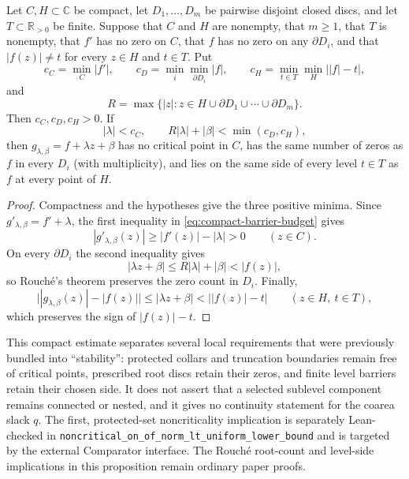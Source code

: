 \documentclass[11pt]{article}
\begin{document}
\begin{proposition}\label{prop:compact-barrier1041}
Let $C,H\subset\mathbb C$ be compact, let $D_1,\ldots,D_m$ be pairwise
disjoint closed discs, and let $T\subset\mathbb R_{>0}$ be finite.  Suppose
that $C$ and $H$ are nonempty, that $m\geq1$, that $T$ is nonempty,
that $f'$ has no zero on $C$, that $f$ has no zero on any $\partial D_i$, and
that $|f(z)|\ne t$ for every $z\in H$ and $t\in T$.  Put
\[
 c_C=\min_C|f'|,\qquad
 c_D=\min_i\min_{\partial D_i}|f|,\qquad
 c_H=\min_{t\in T}\min_H\bigl||f|-t\bigr|,
\]
and
\[
 R=\max\bigl\{|z|:z\in H\cup\partial D_1\cup\cdots\cup\partial D_m\bigr\}.
\]
Then $c_C,c_D,c_H>0$.  If
\[
 |\lambda|<c_C,
 \qquad
 R|\lambda|+|\beta|<\min(c_D,c_H),
\tag{4.2}\label{eq:compact-barrier-budget}
\]
then $g_{\lambda,\beta}=f+\lambda z+\beta$ has no critical point in $C$,
has the same number of zeros as $f$ in every $D_i$ (with multiplicity), and
lies on the same side of every level $t\in T$ as $f$ at every point of $H$.
\end{proposition}

\begin{proof}
Compactness and the hypotheses give the three positive minima.  Since
$g'_{\lambda,\beta}=f'+\lambda$, the first inequality in
\eqref{eq:compact-barrier-budget} gives
\[
 |g'_{\lambda,\beta}(z)|\ge |f'(z)|-|\lambda|>0
 \qquad(z\in C).
\]
On every $\partial D_i$ the second inequality gives
\[
 |\lambda z+\beta|\le R|\lambda|+|\beta|<|f(z)|,
\]
so Rouch\'e's theorem preserves the zero count in $D_i$.  Finally,
\[
 \bigl||g_{\lambda,\beta}(z)|-|f(z)|\bigr|
 \le |\lambda z+\beta|<\bigl||f(z)|-t\bigr|
 \qquad(z\in H,\ t\in T),
\]
which preserves the sign of $|f(z)|-t$.
\end{proof}

\noindent This compact estimate separates several local requirements that
were previously bundled into ``stability'': protected collars and truncation
boundaries remain free of critical points, prescribed root discs retain their
zeros, and finite level barriers retain their chosen side.  It does not assert
that a selected sublevel component remains connected or nested, and it gives
no continuity statement for the coarea slack $q$.
The first, protected-set noncriticality implication is separately Lean-checked
in \texttt{noncritical\_on\_of\_norm\_lt\_uniform\_lower\_bound} and is
targeted by the external Comparator interface.  The Rouch\'e root-count and
level-side implications in this proposition remain ordinary paper proofs.
\end{document}
